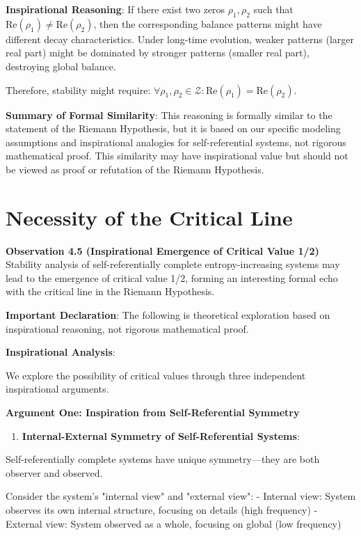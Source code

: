    \textbf{Inspirational Reasoning}: If there exist two zeros $\rho_1, \rho_2$ such that $\text{Re}(\rho_1) \neq \text{Re}(\rho_2)$,
   then the corresponding balance patterns might have different decay characteristics. Under long-time evolution,
   weaker patterns (larger real part) might be dominated by stronger patterns (smaller real part),
   destroying global balance.
   
   Therefore, stability might require: $\forall \rho_1, \rho_2 \in \mathcal{Z}: \text{Re}(\rho_1) = \text{Re}(\rho_2)$.

\textbf{Summary of Formal Similarity}: This reasoning is formally similar to the statement of the Riemann Hypothesis, but it is based on our specific modeling assumptions and inspirational analogies for self-referential systems, not rigorous mathematical proof. This similarity may have inspirational value but should not be viewed as proof or refutation of the Riemann Hypothesis.

\section{Necessity of the Critical Line}
\label{sec:ch04_riemann:necessity-of-the-critical-line}

\textbf{Observation 4.5 (Inspirational Emergence of Critical Value 1/2)}
\label{obs:4.5}
Stability analysis of self-referentially complete entropy-increasing systems may lead to the emergence of critical value 1/2, forming an interesting formal echo with the critical line in the Riemann Hypothesis.

\textbf{Important Declaration}: The following is theoretical exploration based on inspirational reasoning, not rigorous mathematical proof.

\textbf{Inspirational Analysis}:

We explore the possibility of critical values through three independent inspirational arguments.

\textbf{Argument One: Inspiration from Self-Referential Symmetry}

\begin{enumerate}
\item \textbf{Internal-External Symmetry of Self-Referential Systems}:
\end{enumerate}
   Self-referentially complete systems have unique symmetry---they are both observer and observed.
   
   Consider the system's "internal view" and "external view":
   - Internal view: System observes its own internal structure, focusing on details (high frequency)
   - External view: System observed as a whole, focusing on global (low frequency)
   
